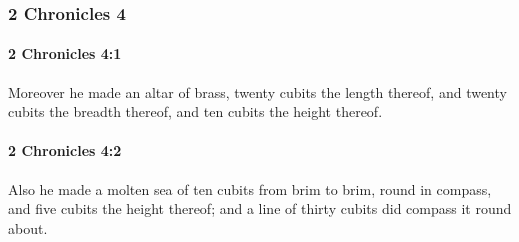 	\subsubsection{2 Chronicles 4} %
		\label{2CHRONICLES-4}

		\paragraph{2 Chronicles 4:1} %
			\label{2CHRONICLES-4-1}

			Moreover he made an altar of brass, twenty cubits the length thereof, and twenty cubits the breadth thereof, and ten cubits the height thereof.


		\paragraph{2 Chronicles 4:2} %
			\label{2CHRONICLES-4-2}

			Also he made a molten sea of ten cubits from brim to brim, round in compass, and five cubits the height thereof; and a line of thirty cubits did compass it round about.

